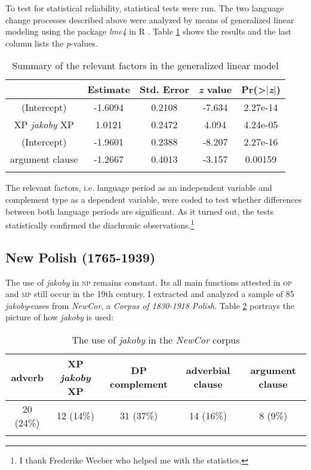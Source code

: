 \documentclass[output=paper
,modfonts
,nonflat]{langsci/langscibook}
\begin{document}
To test for statistical reliability, statistical tests were run. The two language change processes described above were analyzed by means of generalized linear modeling using the package \emph{lme4} \citep{Bates-Maechler-etal2012} in R \citep{Team2012}. Table \ref{static} shows the results and the last column lists the \emph{p}-values.

 \begin{table}[h] \center \begin{tabular}{ccccc} 
\lsptoprule
{} & Estimate & Std. Error & \emph{z} value & Pr(>$\mid$\emph{z}$\mid$) \\
\midrule
(Intercept) & -1.6094 & 0.2108 & -7.634 & 2.27e-14 \\  
XP \emph{jakoby} XP & 1.0121 & 0.2472 & 4.094 & 4.24e-05 \\
(Intercept) & -1.9601 & 0.2388 & -8.207 & 2.27e-16 \\
argument clause & -1.2667 & 0.4013 & -3.157 & 0.00159 \\
 \lspbottomrule
\end{tabular}
\caption{Summary of the relevant factors in the generalized linear model} \label{static}
\end{table}

\noindent  The relevant factors, i.e. language period as an independent variable and complement type as a dependent variable, were coded to test whether differences between both language periods are significant. As it turned out, the tests statistically confirmed the diachronic observations.\footnote{I thank Frederike Weeber who helped me with the statistics.
}
 
\subsection{New Polish (1765-1939)}

The use of \emph{jakoby} in \textsc{np} remains constant. Its all main functions attested in \textsc{op} and \textsc{mp} still occur in the 19th century. I extracted and analyzed a sample of 85 \emph{jakoby}-cases from \emph{NewCor}, a \emph{Corpus of 1830-1918 Polish}. Table \ref{nowopolski_statystka} portrays the picture of how \emph{jakoby} is used:       

\begin{table}[h] \center
\begin{tabular}{ccccc} 
 \lsptoprule
adverb & XP \emph{jakoby} XP & DP complement  & adverbial clause & argument clause \\
\midrule
 20 (24\%) & 12 (14\%) & 31 (37\%) & 14 (16\%) & 8 (9\%)  \\
 \lspbottomrule
\end{tabular}
\caption{The use of \emph{jakoby} in the \emph{NewCor} corpus} \label{nowopolski_statystka}
\end{table}
\end{document}
